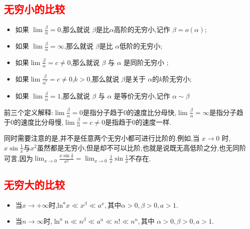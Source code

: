 \documentclass[12pt, a4paper, oneside, UTF8]{ctexbook}  %
\begin{document}
\begin{sloppypar}
    \subsection{\textcolor{red}{无穷小的比较}}
    \begin{defn}{}{}
        \begin{itemize}
            \item 如果 $\lim \frac{\beta}{\alpha} =0$,那么就说 $\beta$是比$\alpha$高阶的无穷小,记作 $\beta=o(\alpha);$
            \item  如果 $\lim \frac\beta\alpha  =\infty$,那么就说 $\beta$是比 $\alpha$低阶的无穷小;
            \item 如果$\lim\frac{\beta}{\alpha} =c\neq 0$,那么就说 $\beta$ 与 $\alpha$ 是同阶无穷小 ;
            \item 如果$\lim\frac{\beta}{\alpha^{^k}} =c \neq 0$,$k > 0$,那么就说 $\beta$是关于 $\alpha$的$k$阶无穷小;
            \item 如果 $\lim \frac\beta\alpha = 1$,那么就说 $\beta$ 与 $\alpha$ 是等价无穷小,记作 $\alpha\sim\beta$
        \end{itemize}
    \end{defn}
    前三个定义解释:$\lim \frac{\beta}{\alpha} =0$是指分子趋于$0$的速度比分母快,$\lim \frac\beta\alpha  =\infty$是指分子趋于$0$的速度比分母慢,$\lim\frac{\beta}{\alpha} =c\neq 0$是指趋于$0$的速度一样.

    同时需要注意的是,并不是任意两个无穷小都可进行比阶的.例如,当 $x\to 0$ 时,$x\sin\frac1x$与$x^2$虽然都是无穷小,但是却不可以比阶,也就是说既无高低阶之分,也无同阶可言,因为$\lim_{x \to 0}\frac{x \sin \frac{1}{x}}{x^2}=\lim_{x\to0}\frac1x\sin\frac1x$不存在.
    \subsection{\textcolor{red}{无穷大的比较}}
    \begin{itemize}
        \item 当$x \to +\infty$时,$\mathrm{ln}^ax\ll x^\beta\ll a^x,\text{其中}\alpha>0,\beta>0,a>1.$
        \item 当$n \to \infty$时,$\ln^an\ll n^\beta\ll a^n\ll n!\ll n^n,\text{其中 }\alpha>0,\beta>0,a>1.$
    \end{itemize}

\end{sloppypar}
\end{document}
